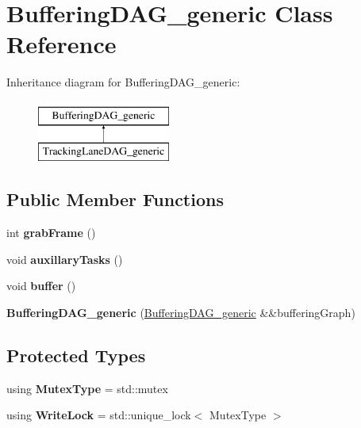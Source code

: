 \hypertarget{classBufferingDAG__generic}{\section{Buffering\-D\-A\-G\-\_\-generic Class Reference}
\label{classBufferingDAG__generic}
}
Inheritance diagram for Buffering\-D\-A\-G\-\_\-generic\-:\begin{figure}[H]
\begin{center}
\leavevmode
\includegraphics[height=2.000000cm]{classBufferingDAG__generic}
\end{center}
\end{figure}
\subsection*{Public Member Functions}
\begin{DoxyCompactItemize}
\item 
\hypertarget{classBufferingDAG__generic_a0e1ee4f8a694fd0fdf2b9893944929e8}{int {\bfseries grab\-Frame} ()}\label{classBufferingDAG__generic_a0e1ee4f8a694fd0fdf2b9893944929e8}

\item 
\hypertarget{classBufferingDAG__generic_a7d58d28db3981dac7aaed4b1badb5d88}{void {\bfseries auxillary\-Tasks} ()}\label{classBufferingDAG__generic_a7d58d28db3981dac7aaed4b1badb5d88}

\item 
\hypertarget{classBufferingDAG__generic_a34a33f6c25ab56c002bb4cd67a9c990c}{void {\bfseries buffer} ()}\label{classBufferingDAG__generic_a34a33f6c25ab56c002bb4cd67a9c990c}

\item 
\hypertarget{classBufferingDAG__generic_a06d2690141f61dec3a1c55fb28d52d22}{{\bfseries Buffering\-D\-A\-G\-\_\-generic} (\hyperlink{classBufferingDAG__generic}{Buffering\-D\-A\-G\-\_\-generic} \&\&buffering\-Graph)}\label{classBufferingDAG__generic_a06d2690141f61dec3a1c55fb28d52d22}

\end{DoxyCompactItemize}
\subsection*{Protected Types}
\begin{DoxyCompactItemize}
\item 
\hypertarget{classBufferingDAG__generic_aee268cc775360e87f89fd05a72f21ec3}{using {\bfseries Mutex\-Type} = std\-::mutex}\label{classBufferingDAG__generic_aee268cc775360e87f89fd05a72f21ec3}

\item 
\hypertarget{classBufferingDAG__generic_af3b29cf93b8f1f13d4c2c5d369daf999}{using {\bfseries Write\-Lock} = std\-::unique\-\_\-lock$<$ Mutex\-Type $>$}\label{classBufferingDAG__generic_af3b29cf93b8f1f13d4c2c5d369daf999}

\end{DoxyCompactItemize}
